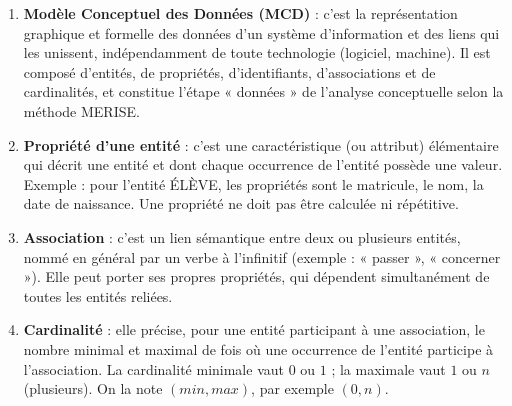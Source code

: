 \documentclass[11pt]{article}
\begin{document}
\begin{corrige}
\begin{enumerate}
\item \textbf{Modèle Conceptuel des Données (MCD)} : c'est la représentation graphique et formelle des données d'un système d'information et des liens qui les unissent, indépendamment de toute technologie (logiciel, machine). Il est composé d'entités, de propriétés, d'identifiants, d'associations et de cardinalités, et constitue l'étape « données » de l'analyse conceptuelle selon la méthode MERISE.
\item \textbf{Propriété d'une entité} : c'est une caractéristique (ou attribut) élémentaire qui décrit une entité et dont chaque occurrence de l'entité possède une valeur. Exemple : pour l'entité ÉLÈVE, les propriétés sont le matricule, le nom, la date de naissance. Une propriété ne doit pas être calculée ni répétitive.
\item \textbf{Association} : c'est un lien sémantique entre deux ou plusieurs entités, nommé en général par un verbe à l'infinitif (exemple : « passer », « concerner »). Elle peut porter ses propres propriétés, qui dépendent simultanément de toutes les entités reliées.
\item \textbf{Cardinalité} : elle précise, pour une entité participant à une association, le nombre minimal et maximal de fois où une occurrence de l'entité participe à l'association. La cardinalité minimale vaut $0$ ou $1$ ; la maximale vaut $1$ ou $n$ (plusieurs). On la note $(min, max)$, par exemple $(0, n)$.
\end{enumerate}
\end{corrige}
\end{document}
